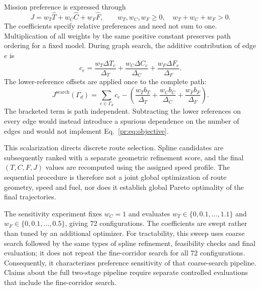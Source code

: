 Mission preference is expressed through
\begin{equation}
 J=w_T\widehat T+w_C\widehat C+w_F\widehat F,\qquad
 w_T,w_C,w_F\ge0,\quad w_T+w_C+w_F>0.
 \label{pr:eq:objective}
\end{equation}
The coefficients specify relative preferences and need not sum to one.
Multiplication of all weights by the same positive constant preserves
path ordering for a fixed model. During graph search, the additive
contribution of edge $e$ is
\begin{equation}
 c_e=\frac{w_T\Delta T_e}{\Delta_T}
     +\frac{w_C\Delta C_e}{\Delta_C}
     +\frac{w_F\Delta F_e}{\Delta_F}.
 \label{pr:eq:edgeobjective}
\end{equation}
The lower-reference offsets are applied once to the complete path:
\begin{equation}
 J^{\mathrm{search}}(\Gamma_d)=\sum_{e\in\Gamma_d}c_e
 -\left(\frac{w_Tb_T}{\Delta_T}+\frac{w_Cb_C}{\Delta_C}
                         +\frac{w_Fb_F}{\Delta_F}\right).
 \label{pr:eq:offset}
\end{equation}
The bracketed term is path independent. Subtracting the lower references
on every edge would instead introduce a spurious dependence on the number
of edges and would not implement Eq.~\eqref{pr:eq:objective}.

This scalarization directs discrete route selection. Spline candidates
are subsequently ranked with a separate geometric refinement score, and
the final $(T,C,F,J)$ values are recomputed using the assigned speed
profile. The sequential procedure is therefore not a joint global
optimization of route geometry, speed and fuel, nor does it establish
global Pareto optimality of the final trajectories.

The sensitivity experiment fixes $w_C=1$ and evaluates
$w_T\in\{0,0.1,\ldots,1.1\}$ and
$w_F\in\{0,0.1,\ldots,0.5\}$, giving 72 configurations.
The coefficients are swept rather than tuned by an additional optimizer.
For tractability, this sweep uses coarse search followed by the same
types of spline refinement, feasibility checks and final evaluation; it
does not repeat the fine-corridor search for all 72 configurations.
Consequently, it characterizes preference sensitivity of that coarse-search
pipeline. Claims about the full two-stage pipeline require separate
controlled evaluations that include the fine-corridor search.
